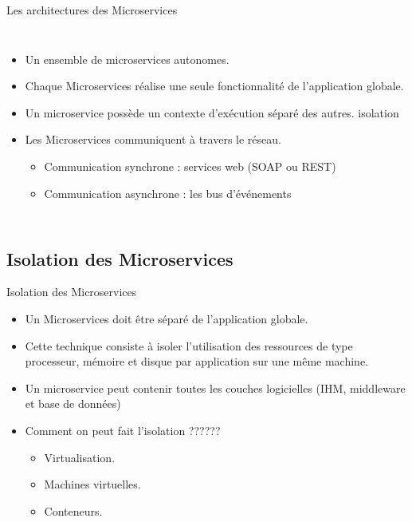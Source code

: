 \documentclass{beamer}
\begin{document}
\begin{frame}{Les architectures des Microservices}
\begin{itemize}
\begin{columns}
\begin{itemize}
            \item Un ensemble de microservices autonomes.
            \item Chaque Microservices réalise une seule fonctionnalité de
                l'application globale.
            \item Un microservice possède un contexte d’exécution séparé
                des autres. \alert{isolation}
            \item Les Microservices communiquent à travers le réseau. 
                \begin{itemize}
                    \item Communication synchrone : services web (\alert{SOAP} ou \alert{REST})
                    \item Communication asynchrone : les bus d’événements 
                \end{itemize}
        \end{itemize} 
    \end{columns}
    \end{itemize}
\end{frame}

\subsection{Isolation des Microservices}

\begin{frame}{Isolation des Microservices}
\begin{itemize}
         \item Un Microservices doit être séparé de l'application globale. 
         \item Cette technique consiste à isoler l’utilisation des ressources de type processeur, mémoire et disque par application sur une même machine.
         \item Un microservice peut contenir toutes les couches logicielles (IHM, middleware et base de données)
         \item Comment on peut fait \alert{l'isolation} ??????
             \begin{itemize}
                 \item Virtualisation.
                 \item \alert{Machines virtuelles}.
                 \item \alert{Conteneurs}.
             \end{itemize}
\end{itemize}
\end{frame}
\end{document}
